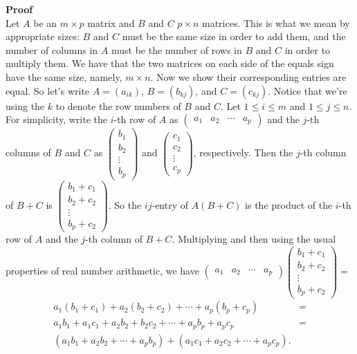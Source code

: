 \documentclass[12pt]{article}
\begin{document}
\noindent
{\bf Proof} \\
 Let $A$ be an $m \times p$ matrix and $B$ and $C$ $p \times n$ matrices. This is what we mean by appropriate sizes: $B$ and $C$ must be the same size in order to add them, and the number of columns in $A$ must be the number of rows in $B$ and $C$ in order to multiply them. We have that the two matrices on each side of the equals sign have the same size, namely, $m \times n$. Now we show their corresponding entries are equal. So let's write $A = (a_{ik})$, $B = (b_{kj})$, and 
$C = (c_{kj})$. Notice that we're using the $k$ to denote the row numbers of $B$ and $C$. Let $1 \leq i \leq m$ and $1 \leq j \leq n$. For simplicity, write the $i$-th row of $A$ as $\begin{pmatrix} a_1 & a_2 & \cdots & a_p \end{pmatrix}$ and the $j$-th columns of $B$ and $C$ as
$\begin{pmatrix} b_1 \\ b_2 \\ \vdots \\ b_p \end{pmatrix}$ and $\begin{pmatrix} c_1 \\ c_2 \\ \vdots \\ c_p \end{pmatrix}$, respectively. Then the $j$-th column of $B + C$ is $\begin{pmatrix} b_1 + c_1 \\ b_2 +c_2 \\ \vdots \\ b_p + c_2 \end{pmatrix}$. So the $ij$-entry of $A(B + C)$ is the product of the $i$-th row of $A$ and the $j$-th column of $B+C$. Multiplying and then using the usual properties of real number arithmetic, we have $\begin{pmatrix} a_1 & a_2 & \cdots & a_p \end{pmatrix} \begin{pmatrix} b_1 + c_1 \\ b_2 +c_2 \\ \vdots \\ b_p + c_2 \end{pmatrix} =$
\begin{align*}
a_1(b_1 + c_1) + a_2(b_2 + c_2) + \cdots + a_p(b_p + c_p) &= \\
a_1 b_1 + a_1 c_1 + a_2 b_2 + b_2 c_2 + \cdots + a_p b_p + a_p c_p &= \\
(a_1 b_1 + a_2 b_2 + \cdots + a_p b_p) + (a_1 c_1 + a_2 c_2 + \cdots +  a_p c_p).
\end{align*}
\end{document}
